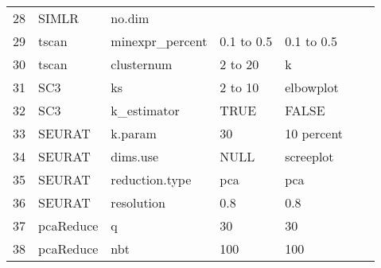 \documentclass[12pt, a4paper]{article}\usepackage[]{graphicx}\usepackage[]{color}
\makeatletter
\newenvironment{kframe}{%
 \def\at@end@of@kframe{}%
 \ifinner\ifhmode%
  \def\at@end@of@kframe{\end{minipage}}%
  \begin{minipage}{\columnwidth}%
 \fi\fi%
 \def\FrameCommand##1{\hskip\@totalleftmargin \hskip-\fboxsep
 \colorbox{shadecolor}{##1}\hskip-\fboxsep
     \hskip-\linewidth \hskip-\@totalleftmargin \hskip\columnwidth}%
 \MakeFramed {\advance\hsize-\width
   \@totalleftmargin\z@ \linewidth\hsize
   \@setminipage}}%
 {\par\unskip\endMakeFramed%
 \at@end@of@kframe}
\makeatother
\begin{document}
\begin{table}[ht]
\begin{tabular}{rllllll}
  28 & SIMLR & no.dim &  &  &  &  \\ 
  29 & tscan & minexpr\_percent & 0.1 to 0.5 & 0.1 to 0.5 &  &  \\ 
  30 & tscan & clusternum & 2 to 20 & k &  &  \\ 
  31 & SC3 & ks & 2 to 10 & elbowplot &  &  \\ 
  32 & SC3 & k\_estimator & TRUE & FALSE &  &  \\ 
  33 & SEURAT & k.param & 30 & 10 percent &  &  \\ 
  34 & SEURAT & dims.use & NULL & screeplot &  &  \\ 
  35 & SEURAT & reduction.type & pca & pca &  &  \\ 
  36 & SEURAT & resolution & 0.8 & 0.8 &  &  \\ 
  37 & pcaReduce & q & 30 & 30 &  &  \\ 
  38 & pcaReduce & nbt & 100 & 100 &  &  \\ 
   \hline
\end{tabular}
\end{table}


\begin{kframe}


{\ttfamily\noindent\bfseries{}}\end{kframe}

\newpage
\end{document}
